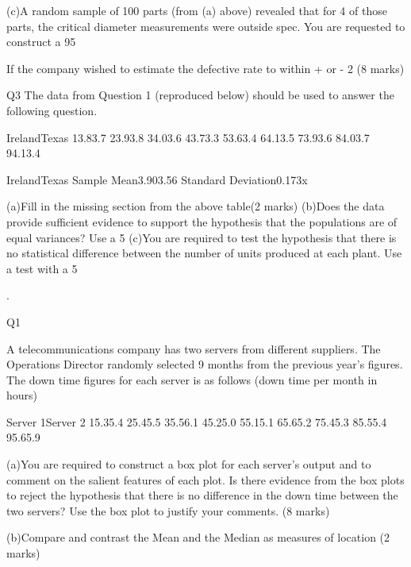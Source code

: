 (c)A random sample of 100 parts (from (a) above) revealed that for 4 of those parts, the critical diameter measurements were outside spec.  You are requested to construct a 95%

If the company wished to estimate the defective rate to within + or - 2%
(8 marks)




Q3
The data from Question 1 (reproduced below) should be used to answer the following question.

IrelandTexas
13.83.7
23.93.8
34.03.6
43.73.3
53.63.4
64.13.5
73.93.6
84.03.7
94.13.4



IrelandTexas
Sample Mean3.903.56
Standard Deviation0.173x

(a)Fill in the missing section from the above table(2 marks)
(b)Does the data provide sufficient evidence to support the hypothesis that the populations are of equal variances?  Use a 5%
(c)You are required to test the hypothesis that there is no statistical difference between the number of units produced at each plant.  Use a test with a 5%





.





Q1

A telecommunications company has two servers from different suppliers. The Operations Director randomly selected 9 months from the previous year’s figures.  The down time figures for each server is as follows (down time per month in hours)


Server 1Server 2
15.35.4
25.45.5
35.56.1
45.25.0
55.15.1
65.65.2
75.45.3
85.55.4
95.65.9


(a)You are required to construct a box plot for each server’s output and to comment on the salient features of each plot.  Is there evidence from the box plots to reject the hypothesis that there is no difference in the down time between the two servers?  Use the box plot to justify your comments. (8 marks)

(b)Compare and contrast the Mean and the Median as measures of location
(2 marks)

